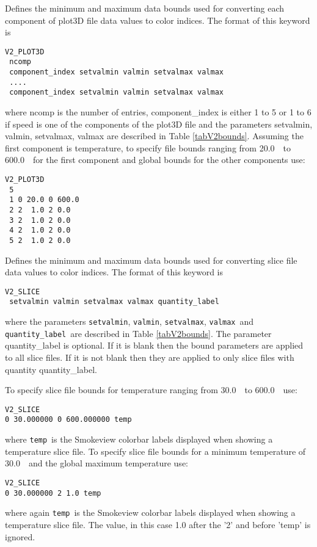 \documentclass[11pt,twoside]{book}
\newcommand{\hitem}[1]{\item[{\bf #1} \hfill]}
\begin{document}
\hitem{V2\_PLOT3D}Defines the minimum and maximum
data bounds used for converting each component of plot3D file data values to color indices.
The format of this keyword is
\begin{lstlisting}
V2_PLOT3D
 ncomp
 component_index setvalmin valmin setvalmax valmax
 ....
 component_index setvalmin valmin setvalmax valmax
\end{lstlisting}
where ncomp is the number of entries,
component\_index is either 1 to 5 or 1 to 6 if speed is one of the components of
the plot3D file  and
the parameters setvalmin, valmin, setvalmax, valmax are described in Table \ref{tabV2bounds}.
Assuming the first component is temperature, to specify file bounds ranging from 20.0~\degC\ to
600.0~\degC\ for the first component and global bounds for the other components use:
\begin{lstlisting}
V2_PLOT3D
 5
 1 0 20.0 0 600.0
 2 2  1.0 2 0.0
 3 2  1.0 2 0.0
 4 2  1.0 2 0.0
 5 2  1.0 2 0.0
\end{lstlisting}

\hitem{V2\_SLICE}Defines the minimum and maximum
data bounds used for converting slice file data values to color indices.
The format of this keyword is
\begin{lstlisting}
V2_SLICE
 setvalmin valmin setvalmax valmax quantity_label
\end{lstlisting}
where the parameters 
{\tt setvalmin}, {\tt valmin}, {\tt setvalmax}, {\tt valmax}\ and {\tt quantity\_label}\ 
are described in Table \ref{tabV2bounds}.
The parameter quantity\_label is optional.  If it is blank then the bound
parameters are applied to all slice files.
If it is not blank then they
are applied to only slice files with quantity quantity\_label.

To specify slice file bounds for temperature ranging from
30.0~\degC\ to 600.0~\degC\ use:
\begin{lstlisting}
V2_SLICE
0 30.000000 0 600.000000 temp
\end{lstlisting}
where {\tt temp}\ is the Smokeview colorbar labels displayed when
showing a temperature slice file.
To specify slice file bounds for a minimum temperature of
30.0~\degC\ and the global maximum temperature use:
\begin{lstlisting}
V2_SLICE
0 30.000000 2 1.0 temp
\end{lstlisting}
where again {\tt temp}\ is the Smokeview colorbar labels displayed when
showing a temperature slice file. The value, in this case 1.0 after the '2' and before 'temp' is ignored.
\end{document}
